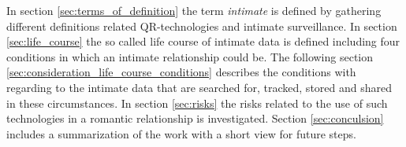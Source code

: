 In section \ref{sec:terms_of_definition} the term \textit{intimate} is defined by gathering different definitions related \acl{QR}-technologies and intimate surveillance.
In section \ref{sec:life_course} the so called life course of intimate data is defined including four conditions in which an intimate relationship could be.
The following section \ref{sec:consideration_life_course_conditions} describes the conditions with regarding to the intimate data that are searched for, tracked, stored and shared in these circumstances.
In section \ref{sec:risks} the risks related to the use of such technologies in a romantic relationship is investigated.
Section \ref{sec:conculsion} includes a summarization of the work with a short view for future steps.

%
%
%
